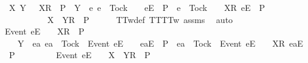 \begin{isabellebody}
\ {\isachardoublequoteopen}{\isasymforall}{\isasymrho}\ X\ Y{\isachardot}\ {\isasymrho}\ {\isacharat}\ {\isacharbrackleft}{\isacharbrackleft}X{\isacharbrackright}\isactrlsub R{\isacharbrackright}\ {\isasymin}\ P\ {\isasymand}\ Y\ {\isasyminter}\ {\isacharbraceleft}e{\isachardot}\ e\ {\isasymnoteq}\ Tock\ {\isasymand}\ {\isasymrho}\ {\isacharat}\ {\isacharbrackleft}{\isacharbrackleft}e{\isacharbrackright}\isactrlsub E{\isacharbrackright}\ {\isasymin}\ P\ {\isasymor}\ e\ {\isacharequal}\ Tock\ {\isasymand}\ {\isasymrho}\ {\isacharat}\ {\isacharbrackleft}{\isacharbrackleft}X{\isacharbrackright}\isactrlsub R{\isacharcomma}\ {\isacharbrackleft}e{\isacharbrackright}\isactrlsub E{\isacharbrackright}\ {\isasymin}\ P{\isacharbraceright}\ {\isacharequal}\ {\isacharbraceleft}{\isacharbraceright}\ {\isasymlongrightarrow}\isanewline
\ \ \ \ \ \ \ \ \ {\isasymrho}\ {\isacharat}\ {\isacharbrackleft}{\isacharbrackleft}X\ {\isasymunion}\ Y{\isacharbrackright}\isactrlsub R{\isacharbrackright}\ {\isasymin}\ P{\isachardoublequoteclose}\isanewline
\ \ \ \ \isamarkupfalse%
\ TT{}w{\isacharunderscore}def\ TT{\isacharunderscore}TT{}w\ assms{\isacharparenleft}{}{\isacharparenright}\ \isamarkupfalse%
\ auto\isanewline
\ \ \isamarkupfalse%
\ \isamarkupfalse%
\ {\isachardoublequoteopen}{\isacharbrackleft}Event\ e{\isacharbrackright}\isactrlsub E\ {\isacharhash}\ {\isasymrho}\ {\isacharat}\ {\isacharbrackleft}{\isacharbrackleft}X{\isacharbrackright}\isactrlsub R{\isacharbrackright}\ {\isasymin}\ P\ {\isasymLongrightarrow}\isanewline
\ \ \ \ Y\ {\isasyminter}\ {\isacharbraceleft}ea{\isachardot}\ ea\ {\isasymnoteq}\ Tock\ {\isasymand}\ {\isacharbrackleft}Event\ e{\isacharbrackright}\isactrlsub E\ {\isacharhash}\ {\isasymrho}\ {\isacharat}\ {\isacharbrackleft}{\isacharbrackleft}ea{\isacharbrackright}\isactrlsub E{\isacharbrackright}\ {\isasymin}\ P\ {\isasymor}\ ea\ {\isacharequal}\ Tock\ {\isasymand}\ {\isacharbrackleft}Event\ e{\isacharbrackright}\isactrlsub E\ {\isacharhash}\ {\isasymrho}\ {\isacharat}\ {\isacharbrackleft}{\isacharbrackleft}X{\isacharbrackright}\isactrlsub R{\isacharcomma}\ {\isacharbrackleft}ea{\isacharbrackright}\isactrlsub E{\isacharbrackright}\ {\isasymin}\ P{\isacharbraceright}\ {\isacharequal}\ {\isacharbraceleft}{\isacharbraceright}\ {\isasymLongrightarrow}\isanewline
\ \ \ \ \ \ {\isacharbrackleft}Event\ e{\isacharbrackright}\isactrlsub E\ {\isacharhash}\ {\isasymrho}\ {\isacharat}\ {\isacharbrackleft}{\isacharbrackleft}X\ {\isasymunion}\ Y{\isacharbrackright}\isactrlsub R{\isacharbrackright}\ {\isasymin}\ P{\isachardoublequoteclose}\isanewline

\end{isabellebody}
